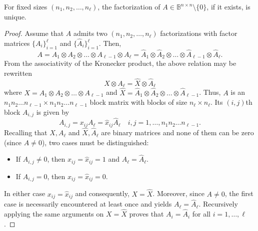 \documentclass[10pt,a4paper]{amsart}
\begin{document}
\begin{lemma}
\label{lem: uniqueness}
For fixed sizes $(n_1,n_2,\dots,n_\ell)$, the factorization of $A \in \mathbb{B}^{n \times n} \setminus \{0\}$, if it exists, is unique.
\end{lemma}

\begin{proof}
Assume that $A$ admits two $(n_1,n_2,\dots,n_\ell)$ factorizations with factor matrices $\{A_i\}_{i=1}^\ell$ and $\{\hat{A}_i\}_{i=1}^\ell$. Then,
\begin{equation*}
    A = A_1 \otimes A_2 \otimes \dots \otimes A_{\ell-1} \otimes A_\ell = \hat{A}_1 \otimes \hat{A}_2 \otimes \dots \otimes \hat{A}_{\ell-1} \otimes \hat{A}_\ell.
\end{equation*}
From the associativity of the Kronecker product, the above relation may be rewritten
\begin{equation*}
    X \otimes A_\ell = \hat{X} \otimes \hat{A}_\ell
\end{equation*}
where $X=A_1 \otimes A_2 \otimes \dots \otimes A_{\ell-1}$ and $\hat{X}=\hat{A}_1 \otimes \hat{A}_2 \otimes \dots \otimes \hat{A}_{\ell-1}$. Thus, $A$ is an $n_1n_2 \dots n_{\ell-1} \times n_1n_2 \dots n_{\ell-1}$ block matrix with blocks of size $n_\ell \times n_\ell$. Its $(i,j)$th block $A_{i,j}$ is given by
\begin{equation*}
    A_{i,j} = x_{ij}A_\ell = \hat{x}_{ij}\hat{A}_\ell \quad i,j=1,\dots,n_1n_2 \dots n_{\ell-1}.
\end{equation*}
Recalling that $X,A_\ell$ and $\hat{X},\hat{A}_\ell$ are binary matrices and none of them can be zero (since $A \neq 0$), two cases must be distinguished:
\begin{itemize}[noitemsep]
    \item If $A_{i,j} \neq 0$, then $x_{ij}=\hat{x}_{ij}=1$ and $A_\ell=\hat{A}_\ell$.
    \item If $A_{i,j} = 0$, then $x_{ij}=\hat{x}_{ij}=0$.
\end{itemize}
In either case $x_{ij}=\hat{x}_{ij}$ and consequently, $X=\hat{X}$. Moreover, since $A \neq 0$, the first case is necessarily encountered at least once and yields $A_\ell=\hat{A}_\ell$. Recursively applying the same arguments on $X=\hat{X}$ proves that $A_i=\hat{A}_i$ for all $i=1,\dots,\ell$.
\end{proof}
\end{document}
